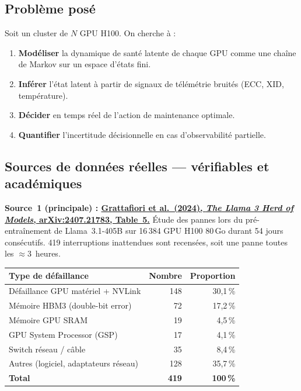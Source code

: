 \documentclass[12pt,a4paper]{article}
\begin{document}
\subsection{Problème posé}

Soit un cluster de $N$ GPU H100. On cherche à :
\begin{enumerate}
  \item \textbf{Modéliser} la dynamique de santé latente de chaque GPU comme une chaîne de Markov
        sur un espace d'états fini.
  \item \textbf{Inférer} l'état latent à partir de signaux de télémétrie bruités (ECC, XID, température).
  \item \textbf{Décider} en temps réel de l'action de maintenance optimale.
  \item \textbf{Quantifier} l'incertitude décisionnelle en cas d'observabilité partielle.
\end{enumerate}

\subsection{Sources de données réelles --- vérifiables et académiques}

\textbf{Source~1 (principale) :
\href{https://arxiv.org/pdf/2407.21783}{Grattafiori et al.\ (2024), \textit{The Llama 3 Herd of Models},
arXiv:2407.21783, Table~5.}}
Étude des pannes lors du pré-entraînement de Llama~3.1-405B sur 16\,384 GPU H100 80\,Go
durant 54 jours consécutifs.
419 interruptions inattendues sont recensées, soit une panne toutes les $\approx 3$~heures.

\begin{center}
\begin{tabular}{lrr}
\toprule
Type de défaillance & Nombre & Proportion \\
\midrule
Défaillance GPU matériel + NVLink & 148 & 30,1\,\% \\
Mémoire HBM3 (double-bit error) & 72  & 17,2\,\% \\
Mémoire GPU SRAM & 19  & 4,5\,\%  \\
GPU System Processor (GSP) & 17  & 4,1\,\%  \\
Switch réseau / câble & 35  & 8,4\,\%  \\
Autres (logiciel, adaptateurs réseau) & 128 & 35,7\,\% \\
\midrule
\textbf{Total} & \textbf{419} & \textbf{100\,\%} \\
\bottomrule
\end{tabular}
\end{center}
\end{document}
